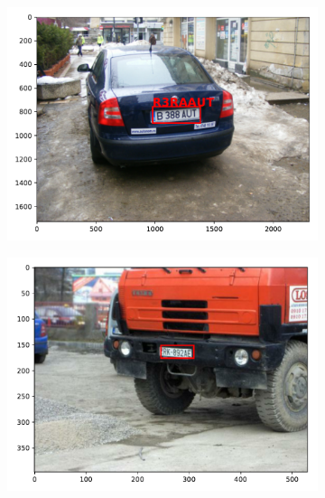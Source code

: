 \begin{figure}
\begin{subfigure}{0.31\textwidth}
        \includegraphics[width=\textwidth]{abbildungen/prediction_05.pdf}
    \end{subfigure}
    \begin{subfigure}{0.31\textwidth}
        \includegraphics[width=\textwidth]{abbildungen/prediction_06.pdf}
    \end{subfigure}
    \begin{subfigure}{0.31\textwidth}

\end{subfigure}
\end{figure}
